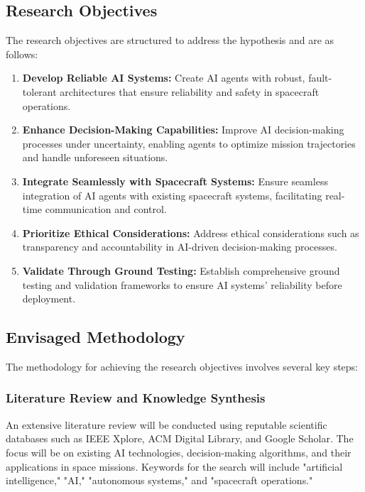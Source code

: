 \documentclass[a4paper, 11pt]{article}
\begin{document}
\subsection{Research Objectives}

The research objectives are structured to address the hypothesis and are as follows:

\begin{enumerate}
    \item \textbf{Develop Reliable AI Systems:} Create AI agents with robust, fault-tolerant architectures that ensure reliability and safety in spacecraft operations.
    \item \textbf{Enhance Decision-Making Capabilities:} Improve AI decision-making processes under uncertainty, enabling agents to optimize mission trajectories and handle unforeseen situations.
    \item \textbf{Integrate Seamlessly with Spacecraft Systems:} Ensure seamless integration of AI agents with existing spacecraft systems, facilitating real-time communication and control.
    \item \textbf{Prioritize Ethical Considerations:} Address ethical considerations such as transparency and accountability in AI-driven decision-making processes.
    \item \textbf{Validate Through Ground Testing:} Establish comprehensive ground testing and validation frameworks to ensure AI systems' reliability before deployment.
\end{enumerate}

\subsection{Envisaged Methodology}

The methodology for achieving the research objectives involves several key steps:

\subsubsection{Literature Review and Knowledge Synthesis}

An extensive literature review will be conducted using reputable scientific databases such as IEEE Xplore, ACM Digital Library, and Google Scholar. The focus will be on existing AI technologies, decision-making algorithms, and their applications in space missions. Keywords for the search will include "artificial intelligence," "AI," "autonomous systems," and "spacecraft operations."
\end{document}
